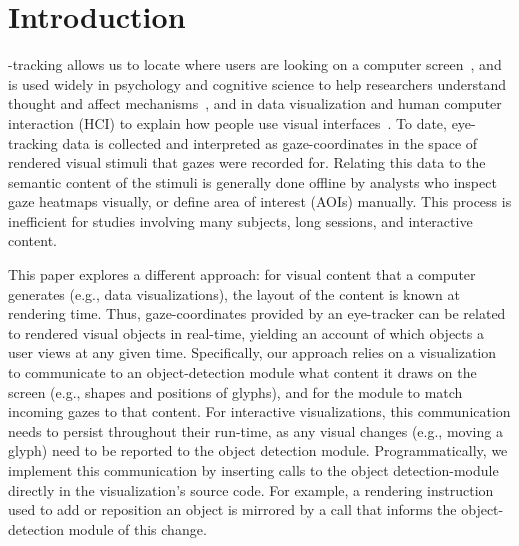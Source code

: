 \section{Introduction}

-tracking allows us to locate where users are looking on a computer screen~\cite{ware1987evaluation,jacob1991use}, and is used widely in psychology and cognitive science to help researchers understand thought and affect mechanisms~\cite{rayner1995eye}, and in data visualization and human computer interaction (HCI) to explain how people use visual interfaces~\cite{duchowski2007eye}.  To date, eye-tracking data is collected and interpreted as gaze-coordinates in the space of rendered visual stimuli that gazes were recorded for. Relating this data to the semantic content of the stimuli is generally done offline by analysts who inspect gaze heatmaps visually, or define area of interest (AOIs) manually. This process is inefficient for studies involving many subjects, long sessions, and interactive content.

This paper explores a different approach: for visual content that a computer generates (e.g., data visualizations), the layout of the content is known at rendering time. Thus, gaze-coordinates provided by an eye-tracker can be related to rendered visual objects in real-time, yielding an account of which objects a user views at any given time. Specifically, our approach relies on a visualization to communicate to an object-detection module what content it draws on the screen (e.g., shapes and positions of glyphs), and for the module to match incoming gazes to that content. For interactive visualizations, this communication needs to persist throughout their run-time, as any visual changes (e.g., moving a glyph) need to be reported to the object detection module. Programmatically, we implement this communication by inserting calls to the object detection-module directly in the visualization's source code. For example, a rendering instruction used to add or reposition an object is mirrored by a call that informs the object-detection module of this change. 

